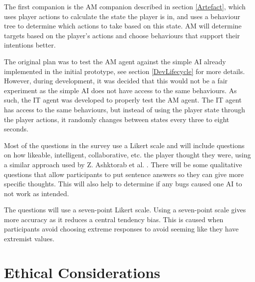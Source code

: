 \documentclass{IEEEtran}
\begin{document}
The first companion is the AM companion described in section \ref{Artefact}, which uses player actions to calculate the state the player is in, and uses a behaviour tree to determine which actions to take based on this state. AM will determine targets based on the player's actions and choose behaviours that support their intentions better.

The original plan was to test the AM agent against the simple AI already implemented in the initial prototype, see section \ref{DevLifecycle} for more details. However, during development, it was decided that this would not be a fair experiment as the simple AI does not have access to the same behaviours. As such, the IT agent was developed to properly test the AM agent. The IT agent has access to the same behaviours, but instead of using the player state through the player actions, it randomly changes between states every three to eight seconds.

Most of the questions in the survey use a Likert scale and will include questions on how likeable, intelligent, collaborative, etc. the player thought they were, using a similar approach used by Z. Ashktorab et al. \cite{SocialPerceptions2020}. There will be some qualitative questions that allow participants to put sentence answers so they can give more specific thoughts. This will also help to determine if any bugs caused one AI to not work as intended.


The questions will use a seven-point Likert scale. Using a seven-point scale gives more accuracy as it reduces a central tendency bias. This is caused when participants avoid choosing extreme responses to avoid seeming like they have extremist values.

\section{Ethical Considerations}
\label{EthicalConsiderations}

\end{document}
